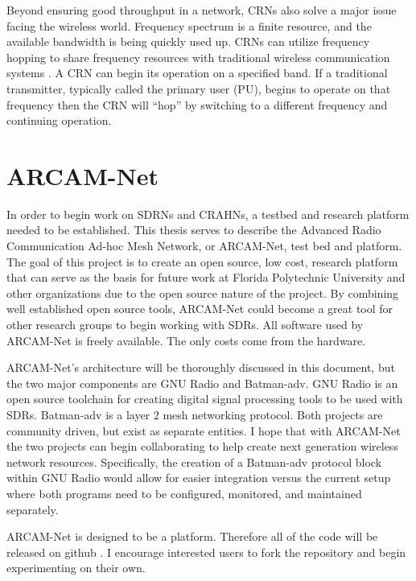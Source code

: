 Beyond ensuring good throughput in a network, CRNs also solve a major issue facing the wireless world. Frequency spectrum is a finite resource, and the available bandwidth is being quickly used up. CRNs can utilize frequency hopping to share frequency resources with traditional wireless communication systems  \cite{6892537}. A CRN can begin its operation on a specified band. If a traditional transmitter, typically called the primary user (PU), begins to operate on that frequency then the CRN will ``hop'' by switching to a different frequency and continuing operation. 


\section{ARCAM-Net}

In order to begin work on SDRNs and CRAHNs, a testbed and research platform needed to be established. This thesis serves to describe the Advanced Radio Communication Ad-hoc Mesh Network, or ARCAM-Net, test bed and platform. The goal of this project is to create an open source, low cost, research platform that can serve as the basis for future work at Florida Polytechnic University and other organizations due to the open source nature of the project. By combining well established open source tools, ARCAM-Net could become a great tool for other research groups to begin working with SDRs. All software used by ARCAM-Net is freely available. The only costs come from the hardware. 

ARCAM-Net's architecture will be thoroughly discussed in this document, but the two major components are GNU Radio and Batman-adv. GNU Radio is an open source toolchain for creating digital signal processing tools to be used with SDRs. Batman-adv is a layer 2 mesh networking protocol. Both projects are community driven, but exist as separate entities. I hope that with ARCAM-Net the two projects can begin collaborating to help create next generation wireless network resources. Specifically, the creation of a Batman-adv protocol block within GNU Radio would allow for easier integration versus the current setup where both programs need to be configured, monitored, and maintained separately. 

ARCAM-Net is designed to be a platform. Therefore all of the code will be released on github \cite{MYGITHUB}. I encourage interested users to fork the repository and begin experimenting on their own. 

